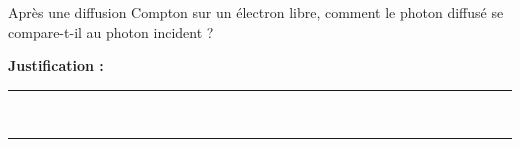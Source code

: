 Après une diffusion Compton sur un électron libre, comment le photon diffusé se compare-t-il au photon incident ?

\choices

\noindent\textbf{Justification :} \hrulefill \\[2.5ex]
\rule{\linewidth}{0.4pt} \\[2.5ex]
\rule{\linewidth}{0.4pt}
\vfill
